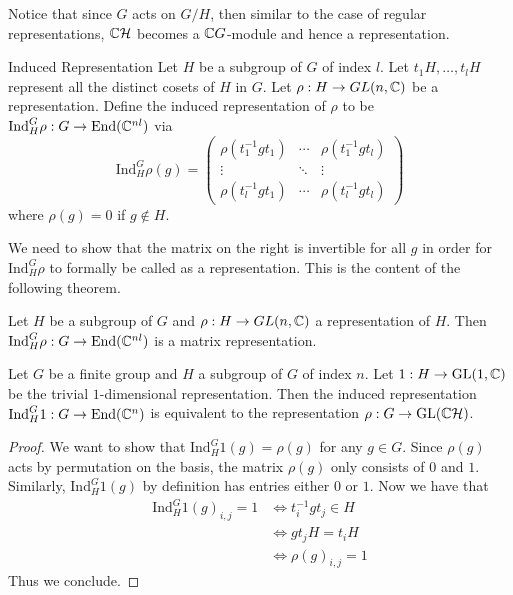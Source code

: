 \documentclass[a4paper]{article}
\begin{document}
Notice that since $G$ acts on $G/H$, then similar to the case of regular representations, $\mathbb{C}\mathcal{H}$ becomes a $\mathbb{C} G$-module and hence a representation. 

\begin{defn}{Induced Representation}{} Let $H$ be a subgroup of $G$ of index $l$. Let $t_1H,\dots,t_lH$ represent all the distinct cosets of $H$ in $G$. Let $\rho:H\to GL(n,\mathbb{C})$ be a representation. Define the induced representation of $\rho$ to be $\text{Ind}_H^G\rho:G\to\text{End}(\mathbb{C}^{nl})$ via $$\text{Ind}_H^G\rho(g)=\begin{pmatrix}
\rho(t_1^{-1}gt_1) & \cdots & \rho(t_1^{-1}gt_l)\\
\vdots & \ddots & \vdots\\
\rho(t_l^{-1}gt_1) & \cdots & \rho(t_l^{-1}gt_l)
\end{pmatrix}$$ where $\rho(g)=0$ if $g\notin H$. 
\end{defn}

We need to show that the matrix on the right is invertible for all $g$ in order for $\text{Ind}_H^G\rho$ to formally be called as a representation. This is the content of the following theorem. 

\begin{thm}{}{} Let $H$ be a subgroup of $G$ and $\rho:H\to GL(n,\mathbb{C})$ a representation of $H$. Then $\text{Ind}_H^G\rho:G\to\text{End}(\mathbb{C}^{nl})$ is a matrix representation. 
\end{thm}

\begin{prp}{}{} Let $G$ be a finite group and $H$ a subgroup of $G$ of index $n$. Let $1:H\to\text{GL}(1,\mathbb{C})$ be the trivial $1$-dimensional representation. Then the induced representation $\text{Ind}_H^G1:G\to\text{End}(\mathbb{C}^n)$ is equivalent to the representation $\rho:G\to\text{GL}(\mathbb{C}\mathcal{H})$. \tcbline
\begin{proof}
We want to show that $\text{Ind}_H^G1(g)=\rho(g)$ for any $g\in G$. Since $\rho(g)$ acts by permutation on the basis, the matrix $\rho(g)$ only consists of $0$ and $1$. Similarly, $\text{Ind}_H^G1(g)$ by definition has entries either $0$ or $1$. Now we have that 
\begin{align*}
\text{Ind}_H^G1(g)_{i,j}=1&\iff t_i^{-1}gt_j\in H\\
&\iff gt_jH=t_iH\\
&\iff\rho(g)_{i,j}=1
\end{align*}
Thus we conclude. 
\end{proof}
\end{prp}
\end{document}
